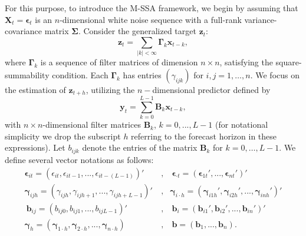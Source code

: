 \documentclass[11pt,a4paper]{article}
\begin{document}
For this purpose, to introduce the M-SSA framework, we begin by assuming that  $\mathbf{X}_t=\boldsymbol{\epsilon}_t$ is an $n$-dimensional white noise sequence with a full-rank variance-covariance matrix $\boldsymbol{\Sigma}$.
Consider the generalized target $\mathbf{z}_t$:
\[
\mathbf{z}_t=\sum_{|k|<\infty}\boldsymbol{\Gamma}_k\mathbf{x}_{t-k},
\] 
where $\boldsymbol{\Gamma}_k$  is a sequence of filter matrices of dimension  $n\times n$, satisfying the square-summability condition. Each $\boldsymbol{\Gamma}_k$ has entries $(\gamma_{ijk})$ for $i, j = 1, \ldots, n$. We focus on the estimation of $\mathbf{z}_{t+h}$, utilizing the $n-$dimensional predictor defined by
\[
\mathbf{y}_t = \sum_{k=0}^{L-1} \mathbf{B}_k \mathbf{x}_{t-k},
\]
with $n\times n$-dimensional filter matrices $\mathbf{B}_k$, $k=0,...,L-1$ (for notational simplicity we drop the subscript $h$ referring to the forecast horizon in these expressions). Let $b_{ijk}$ denote the entries of the matrix $\mathbf{B}_k$ for $k = 0, \ldots, L-1$. We define several vector notations as follows:
\begin{eqnarray*}
\boldsymbol{\epsilon}_{it}=(\epsilon_{it},\epsilon_{it-1},...,\epsilon_{it-(L-1)})'~&,&~\boldsymbol{\epsilon}_{\cdot t}=(\boldsymbol{\epsilon}_{1t}',...,\boldsymbol{\epsilon}_{nt}')'\\
\boldsymbol{\gamma}_{ijh}=(\gamma_{ijh},\gamma_{ijh+1},...,\gamma_{ijh+L-1})'~&,&\boldsymbol{\gamma}_{i\cdot h}=(\boldsymbol{\gamma}_{i1h}',\boldsymbol{\gamma}_{i2h}',...,\boldsymbol{\gamma}_{inh}')'\\
~\mathbf{b}_{ij}=(b_{ij0},b_{ij1},...,b_{ijL-1})'~&,&~\mathbf{b}_{i}=(\mathbf{b}_{i1}',\mathbf{b}_{i2}',...,\mathbf{b}_{in}')'\\
\boldsymbol{\gamma}_{h}=(\boldsymbol{\gamma}_{1\cdot h},\boldsymbol{\gamma}_{2\cdot h},...,\boldsymbol{\gamma}_{n\cdot h})
~&,&~\mathbf{b}=(\mathbf{b}_1,...,\mathbf{b}_n).%
\end{eqnarray*} 
\end{document}

